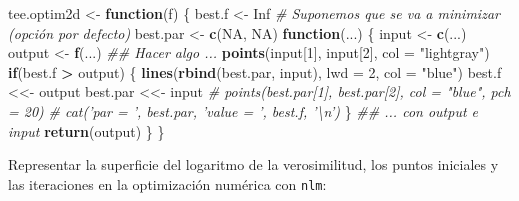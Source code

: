 \documentclass[
]{book}
\newenvironment{Shaded}{\begin{snugshade}}{\end{snugshade}}
\newcommand{\CommentTok}[1]{\textcolor[rgb]{0.56,0.35,0.01}{\textit{#1}}}
\newcommand{\ControlFlowTok}[1]{\textcolor[rgb]{0.13,0.29,0.53}{\textbf{#1}}}
\newcommand{\DataTypeTok}[1]{\textcolor[rgb]{0.13,0.29,0.53}{#1}}
\newcommand{\DecValTok}[1]{\textcolor[rgb]{0.00,0.00,0.81}{#1}}
\newcommand{\KeywordTok}[1]{\textcolor[rgb]{0.13,0.29,0.53}{\textbf{#1}}}
\newcommand{\NormalTok}[1]{#1}
\newcommand{\OperatorTok}[1]{\textcolor[rgb]{0.81,0.36,0.00}{\textbf{#1}}}
\newcommand{\OtherTok}[1]{\textcolor[rgb]{0.56,0.35,0.01}{#1}}
\newcommand{\StringTok}[1]{\textcolor[rgb]{0.31,0.60,0.02}{#1}}
\theoremstyle{break}
\theoremstyle{definition}
\theoremstyle{definition}
\theoremstyle{definition}
\theoremstyle{remark}
\begin{document}
\begin{Shaded}
\begin{Highlighting}[]
\NormalTok{tee.optim2d <-}\StringTok{ }\ControlFlowTok{function}\NormalTok{(f) \{}
\NormalTok{  best.f <-}\StringTok{ }\OtherTok{Inf}   \CommentTok{# Suponemos que se va a minimizar (opción por defecto)}
\NormalTok{  best.par <-}\StringTok{ }\KeywordTok{c}\NormalTok{(}\OtherTok{NA}\NormalTok{, }\OtherTok{NA}\NormalTok{)   }
  \ControlFlowTok{function}\NormalTok{(...) \{}
\NormalTok{    input <-}\StringTok{ }\KeywordTok{c}\NormalTok{(...)}
\NormalTok{    output <-}\StringTok{ }\KeywordTok{f}\NormalTok{(...)}
    \CommentTok{## Hacer algo ...}
    \KeywordTok{points}\NormalTok{(input[}\DecValTok{1}\NormalTok{], input[}\DecValTok{2}\NormalTok{], }\DataTypeTok{col =} \StringTok{"lightgray"}\NormalTok{)}
    \ControlFlowTok{if}\NormalTok{(best.f }\OperatorTok{>}\StringTok{ }\NormalTok{output) \{}
      \KeywordTok{lines}\NormalTok{(}\KeywordTok{rbind}\NormalTok{(best.par, input), }\DataTypeTok{lwd =} \DecValTok{2}\NormalTok{, }\DataTypeTok{col =} \StringTok{"blue"}\NormalTok{)}
\NormalTok{      best.f <<-}\StringTok{ }\NormalTok{output}
\NormalTok{      best.par <<-}\StringTok{ }\NormalTok{input}
      \CommentTok{# points(best.par[1], best.par[2], col = "blue", pch = 20)}
      \CommentTok{# cat('par = ', best.par, 'value = ', best.f, '\textbackslash{}n')}
\NormalTok{    \} }
    \CommentTok{## ... con output e input}
    \KeywordTok{return}\NormalTok{(output)}
\NormalTok{  \}}
\NormalTok{\}}
\end{Highlighting}
\end{Shaded}

Representar la superficie del logaritmo de la verosimilitud,
los puntos iniciales y las iteraciones en la optimización numérica con \texttt{nlm}:
\end{document}
